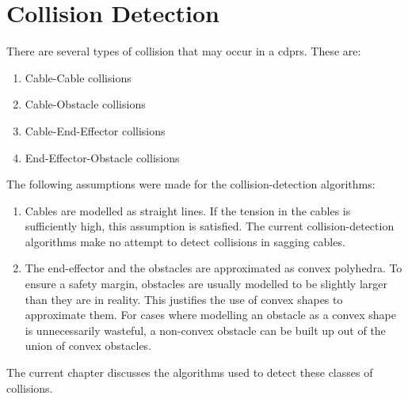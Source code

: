 \chapter{Collision Detection}%
\label{chap:collision_detection}

	There are several types of collision that may occur in a \glspl{cdpr}. These
	are:

	\begin{enumerate}

		\item Cable-Cable collisions

		\item Cable-Obstacle collisions

		\item Cable-End-Effector collisions

		\item End-Effector-Obstacle collisions

	\end{enumerate}

	The following assumptions were made for the collision-detection
	algorithms:

	\begin{enumerate}

		\item

			Cables are modelled as straight lines. If the tension in the cables
			is sufficiently high, this assumption is satisfied. The current
			collision-detection algorithms make no attempt to detect collisions
			in sagging cables.

		\item

			The end-effector and the obstacles are approximated as convex
			polyhedra. To ensure a safety margin, obstacles are usually modelled
			to be slightly larger than they are in reality. This justifies the
			use of convex  shapes to approximate them. For cases where modelling
			an obstacle as a convex shape is unnecessarily wasteful, a
			non-convex obstacle can be built up out of the union of convex
			obstacles.

	\end{enumerate}

	The current chapter discusses the algorithms used to detect these classes of
	collisions.

	
	
	
	
	
	
